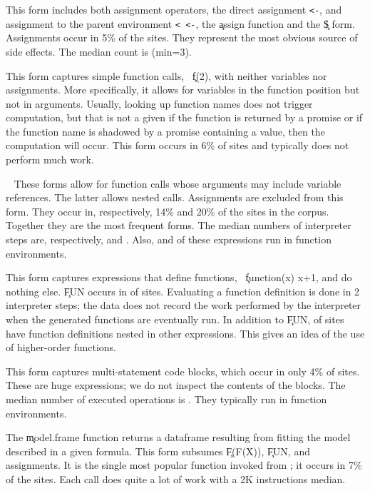 \documentclass[screen,acmsmall]{acmart}%
\begin{document}
\medskip{} This form includes both assignment
operators, the direct assignment {\tt <-}, and assignment to the parent
environment {\tt <\,\!<-}, the \c{assign} function and the \c{\$} form.
Assignments occur in 5\% of the sites. They represent the most obvious source of
side effects. The median count is \packageMinimizedmedianoperationsiRnd (min=3).

\medskip{} This form captures simple function calls,
\eg~\c{f(2)}, with neither variables nor assignments. More specifically, it
allows for variables in the function position but not in arguments. Usually,
looking up function names does not trigger computation, but that is not a given
if the function is returned by a promise or if the function name is shadowed by
a promise containing a value, then the computation will occur. This form occurs in
6\% of sites and typically does not perform much work.

\medskip{}~ These
forms allow for function calls whose arguments may include variable references.
The latter allows nested calls. Assignments are excluded from this form. They
occur in, respectively, 14\% and 20\% of the sites in the corpus. Together they
are the most frequent forms. The median numbers of interpreter steps are,
respectively, \packageMinimizedmedianoperationsdRnd and
\packageMinimizedmedianoperationsbRnd. Also,
\packageMinimizedpercentparentframesd and \packageMinimizedpercentparentframesb
of these expressions run in function environments.

\medskip{} This form captures expressions that
define functions, \eg~\c{function(x) x+1}, and do nothing else. \c{FUN} occurs
in \packageFunctionDefinitionSitesPercent of sites. Evaluating a function
definition is done in 2 interpreter steps; the data does not record the work
performed by the interpreter when the generated functions are eventually run. In
addition to \c{FUN}, \packageGeneralizedFunctionDefinitionSitesPercent of sites
have function definitions nested in other expressions. This gives an idea of the
use of higher-order functions.

\medskip{} This form captures multi-statement
code blocks, which occur in only 4\% of sites. These are huge expressions; we
do not inspect the contents of the blocks. The median number of executed operations
is \packageMinimizedmedianoperationsjRnd. They typically run in function
environments.

\medskip{} The \c{model.frame} function
returns a dataframe resulting from fitting the model described in a given
formula. This form subsumes \c{F(F(X))}, \c{FUN}, and assignments. It is the
single most popular function invoked from \eval; it occurs in 7\% of the sites.
Each call does quite a lot of work with a 2K instructions median.
\end{document}
